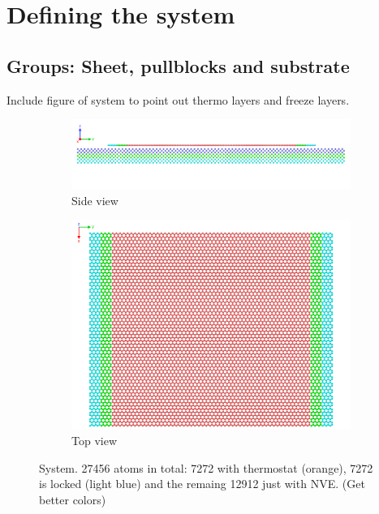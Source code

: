 
\section{Defining the system}

\subsection{Groups: Sheet, pullblocks and substrate}
Include figure of system to point out thermo layers and freeze layers.


\begin{figure}[H]
  \centering
  \begin{subfigure}[b]{0.80\textwidth}
      \centering
      \includegraphics[width=\textwidth]{figures/system_sideview.png}
      \caption{Side view}
      \label{fig:sideview}
  \end{subfigure}
  \hfill
  \begin{subfigure}[b]{0.80\textwidth}
      \centering
      \includegraphics[width=\textwidth]{figures/system_topview.png}
      \caption{Top view}
      \label{fig:topview}
  \end{subfigure}
  \hfill
     \caption{System. 27456 atoms in total: 7272 with thermostat (orange), 7272 is locked (light blue) and the remaing 12912 just with NVE. (Get better colors)}
     \label{fig:system}
\end{figure}



